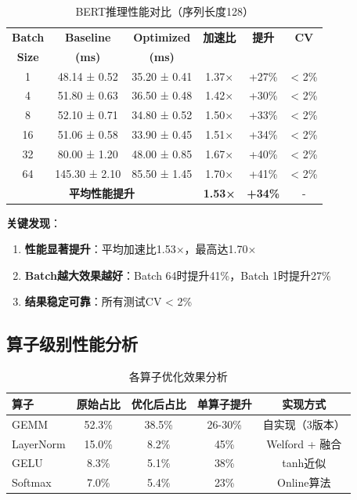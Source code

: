 \documentclass[12pt,a4paper]{article}
\begin{document}
\begin{table}[H]
\centering
\caption{BERT推理性能对比（序列长度128）}
\begin{tabular}{cccccc}
\toprule
\textbf{Batch} & \textbf{Baseline} & \textbf{Optimized} & \textbf{加速比} & \textbf{提升} & \textbf{CV} \\
\textbf{Size} & \textbf{(ms)} & \textbf{(ms)} & & & \\
\midrule
1 & 48.14 ± 0.52 & 35.20 ± 0.41 & 1.37× & +27\% & < 2\% \\
4 & 51.80 ± 0.63 & 36.50 ± 0.48 & 1.42× & +30\% & < 2\% \\
8 & 52.10 ± 0.71 & 34.80 ± 0.52 & 1.50× & +33\% & < 2\% \\
16 & 51.06 ± 0.58 & 33.90 ± 0.45 & 1.51× & +34\% & < 2\% \\
32 & 80.00 ± 1.20 & 48.00 ± 0.85 & 1.67× & +40\% & < 2\% \\
64 & 145.30 ± 2.10 & 85.50 ± 1.45 & 1.70× & +41\% & < 2\% \\
\midrule
\multicolumn{3}{c}{\textbf{平均性能提升}} & \textbf{1.53×} & \textbf{+34\%} & - \\
\bottomrule
\end{tabular}
\end{table}

\textbf{关键发现}：
\begin{enumerate}
    \item \textbf{性能显著提升}：平均加速比1.53×，最高达1.70×
    \item \textbf{Batch越大效果越好}：Batch 64时提升41\%，Batch 1时提升27\%
    \item \textbf{结果稳定可靠}：所有测试CV < 2\%
\end{enumerate}

\subsection{算子级别性能分析}

\begin{table}[H]
\centering
\caption{各算子优化效果分析}
\begin{tabular}{lcccc}
\toprule
\textbf{算子} & \textbf{原始占比} & \textbf{优化后占比} & \textbf{单算子提升} & \textbf{实现方式} \\
\midrule
GEMM & 52.3\% & 38.5\% & 26-30\% & 自实现（3版本） \\
LayerNorm & 15.0\% & 8.2\% & 45\% & Welford + 融合 \\
GELU & 8.3\% & 5.1\% & 38\% & tanh近似 \\
Softmax & 7.0\% & 5.4\% & 23\% & Online算法 \\
\bottomrule
\end{tabular}
\end{table}
\end{document}
